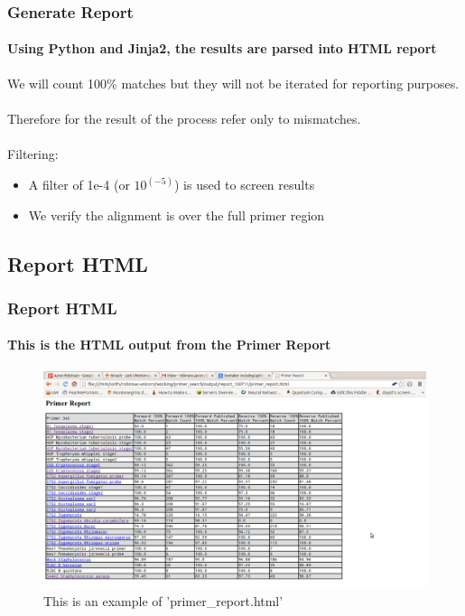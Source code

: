 \documentclass{beamer}
\newcommand{\subsectiontitle}{}
\newcommand{\newsubsection}[1]{\renewcommand{\subsectiontitle}{#1}\subsection{#1}}
\begin{document}
  \begin{frame}
    \frametitle{Generate Report}
    \framesubtitle{Using Python and Jinja2, the results are parsed into HTML report}
    
	We will count 100\% matches but they will not be iterated for reporting purposes. \\ \hfill \\ 
	
	Therefore for the result of the process refer only to mismatches. \\ \hfill \\ 
    
	Filtering:
	
	\begin{itemize} \itemsep.5em
	  \item A filter of 1e-4 (or $10^(-5)$) is used to screen results
	  \item We verify the alignment is over the full primer region
	\end{itemize}
    
  \end{frame}
  
  \newsubsection{Report HTML}
  \begin{frame}
    \frametitle{Report HTML}
    \framesubtitle{This is the HTML output from the Primer Report}
    \begin{figure}[htp]
	\centering
	\includegraphics[width=1\textwidth]{primer_report}
	\caption{This is an example of 'primer\_report.html'}\label{fig:primer_report}
	\end{figure}
  \end{frame}
  
\end{document}

